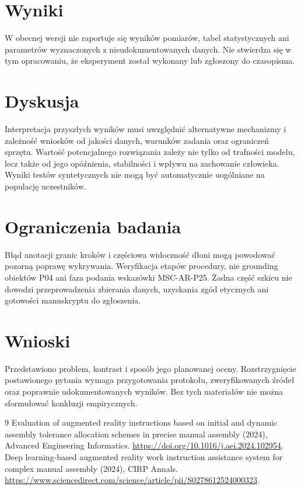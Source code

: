 \documentclass[11pt,a4paper]{article}
\begin{document}
\section{Wyniki}

W obecnej wersji nie raportuje się wyników pomiarów, tabel statystycznych ani parametrów wyznaczonych z nieudokumentowanych danych. Nie stwierdza się w tym opracowaniu, że eksperyment został wykonany lub zgłoszony do czasopisma.

\section{Dyskusja}

Interpretacja przyszłych wyników musi uwzględnić alternatywne mechanizmy i zależność wniosków od jakości danych, warunków zadania oraz ograniczeń sprzętu. Wartość potencjalnego rozwiązania zależy nie tylko od trafności modelu, lecz także od jego opóźnienia, stabilności i wpływu na zachowanie człowieka. Wyniki testów syntetycznych nie mogą być automatycznie uogólniane na populację uczestników.

\section{Ograniczenia badania}

Błąd anotacji granic kroków i częściowa widoczność dłoni mogą powodować pozorną poprawę wykrywania. Weryfikacja etapów procedury, nie grounding obiektów P04 ani faza podania wskazówki MSC-AR-P25. Żadna część szkicu nie dowodzi przeprowadzenia zbierania danych, uzyskania zgód etycznych ani gotowości manuskryptu do zgłoszenia.

\section{Wnioski}

Przedstawiono problem, kontrast i sposób jego planowanej oceny. Rozstrzygnięcie postawionego pytania wymaga przygotowania protokołu, zweryfikowanych źródeł oraz poprawnie udokumentowanych wyników. Bez tych materiałów nie można sformułować konkluzji empirycznych.

\begin{thebibliography}{9}
 Evaluation of augmented reality instructions based on initial and dynamic assembly tolerance allocation schemes in precise manual assembly (2024), Advanced Engineering Informatics. \url{https://doi.org/10.1016/j.aei.2024.102954}.
 Deep learning-based augmented reality work instruction assistance system for complex manual assembly (2024), CIRP Annals. \url{https://www.sciencedirect.com/science/article/pii/S0278612524000323}.
\end{thebibliography}
\end{document}

